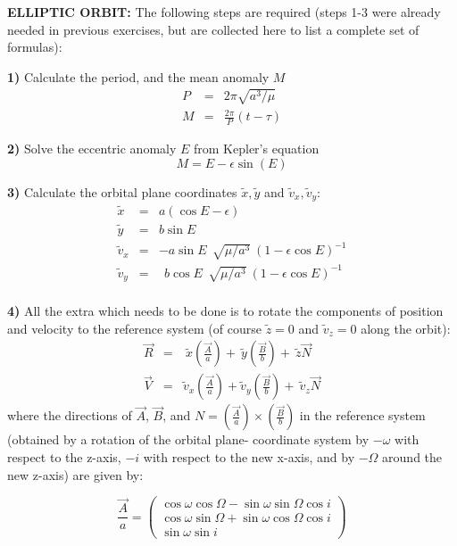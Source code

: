 \documentclass[a4paper,12pt]{article}
\def\sini {\sin i}
\def\cosi {\cos i}
\def\sino {\sin \Omega}
\def\coso {\cos \Omega}
\def\sinw {\sin \omega}
\def\cosw {\cos \omega}
\begin{document}
{{{\bf ELLIPTIC ORBIT: }
The following steps are required (steps 1-3 were already
needed in previous exercises, but are collected here to list a complete set of formulas):

{\bf 1)} Calculate the period, and the mean anomaly $M$
\begin{eqnarray}
P &=& 2\pi \sqrt{a^3/\mu} \\ \nonumber
M &=& \frac{2\pi}{P}(t-\tau)
\label{period}
\end{eqnarray}

{\bf 2)} Solve the eccentric anomaly $E$ from Kepler's equation
\begin{equation}
M = E - \epsilon \sin(E)
\end{equation}

{\bf 3)} Calculate the orbital plane coordinates $\tilde x, \tilde y$ and $\tilde v_x, \tilde v_y$:
\begin{eqnarray}
{\tilde x} &=& a (\cos E - \epsilon) \\ \nonumber
{\tilde y} &=& b  \sin E             \\ \nonumber 
{\tilde v_x} &=& -a \sin E  ~~ \sqrt{\mu/a^3} \ (1-\epsilon \cos E)^{-1}    \\ \nonumber
{\tilde v_y} &=&  ~~ b \cos E ~~ \sqrt{\mu/a^3} \  (1-\epsilon \cos E)^{-1}      \\ \nonumber
\end{eqnarray}

\newpage
{\bf 4)} All the extra which needs to be done is to rotate the components of
position and velocity to the reference system (of course $\tilde z=0$ and $\tilde v_z=0$ along the orbit):
\begin{eqnarray}
\vec R &=& \ \tilde x \left( \frac{\vec A}{a}\right) + \ \tilde y \left( \frac{\vec B}{b}\right) + \ \tilde z \vec N \\ \nonumber
\vec V &=& \tilde v_x\left( \frac{\vec A}{a}\right)  + \tilde v_y \left( \frac{\vec B}{b}\right) + \ \tilde v_z \vec N
\end{eqnarray}
\noindent where the directions of $\vec A$, $\vec B$, and $N= \left( \frac{\vec A}{a}\right) \times \left( \frac{\vec B}{b}\right)$ in the reference system
 (obtained by a rotation of the orbital plane-  coordinate system by $-\omega$ with respect to the z-axis, $-i$ with respect to the new x-axis, and by $-\Omega$ around the new z-axis) are given by:

\begin{equation}
\frac{\vec A}{a} = \begin{pmatrix} \cosw \coso - \sinw \sino \cosi \\ \cosw \sino + \sinw \coso \cosi \\ \sinw \sini \end{pmatrix}
\end{equation}

}}
\end{document}
